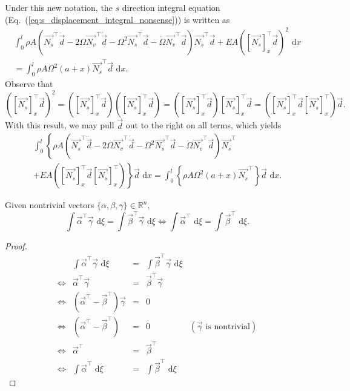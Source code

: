 Under this new notation, the $s$ direction integral equation (Eq.~(\ref{eq:s_displacement_integral_nonsense})) is written as
\begin{eqnarray}
\int_0^l \rho A\left(\vec{N_s}^\top\ddot{\vec d}-2\Omega\vec{N_v}^\top\dot{\vec{d}}-\Omega^2\vec{N_s}^\top\vec{d}-\dot\Omega \vec{N_v}^\top\vec{d}\right)\vec{N_s}^\top\vec{d}+EA\left([\vec{N_s}]_x^\top\vec{d}\right)^2 \text{ d}x  \\
= \int_0^l \rho A\Omega^2(a+x)\vec{N_s}^\top\vec{d}\text{ d}x. \nonumber
\end{eqnarray}
Observe that
\begin{equation}
\left([\vec{N_s}]_x^\top\vec{d}\right)^2 = 
\left([\vec{N_s}]_x^\top\vec{d}\right)\left([\vec{N_s}]_x^\top\vec{d}\right) = 
\left([\vec{N_s}]_x^\top\vec{d}\right)[\vec{N_s}]_x^\top\vec{d} = 
\left([\vec{N_s}]_x^\top\vec{d}[\vec{N_s}]_x^\top\right)\vec{d}.
\label{eq:vec_prod_square}
\end{equation}
With this result, we may pull $\vec d$ out to the right on all terms, which yields
\begin{eqnarray}
\int_0^l \left\lbrace\rho A\left(\vec{N_s}^\top\ddot{\vec d}-2\Omega\vec{N_v}^\top\dot{\vec{d}}-\Omega^2\vec{N_s}^\top\vec{d}-\dot\Omega \vec{N_v}^\top\vec{d}\right)\vec{N_s}^\top\right. \\
\left.+EA\left([\vec{N_s}]_x^\top\vec{d}[\vec{N_s}]_x^\top\right) \right\rbrace\vec{d}\text{ d}x = \int_0^l \left\lbrace\rho A\Omega^2(a+x)\vec{N_s}^\top\right\rbrace\vec{d}\text{ d}x. \nonumber
\end{eqnarray}
\begin{lemma}
Given nontrivial vectors $\{\alpha,\beta,\gamma\}\in\mathbb{R}^n,$
\begin{equation}
\int\vec{\alpha}^\top\vec{\gamma}\text{ d}\xi = \int\vec{\beta}^\top\vec{\gamma}\text{ d}\xi \Leftrightarrow \int\vec{\alpha}^\top\text{ d}\xi = \int\vec{\beta}^\top\text{ d}\xi.
\end{equation}
\end{lemma}
\begin{proof}
\begin{equation}
\begin{array}{rrclr}
&\int\vec{\alpha}^\top\vec{\gamma}\text{ d}\xi &=& \int\vec{\beta}^\top\vec{\gamma}\text{ d}\xi &\\
\Leftrightarrow& \vec{\alpha}^\top\vec{\gamma} &=& \vec{\beta}^\top\vec{\gamma} &\\
\Leftrightarrow& \left(\vec{\alpha}^\top -  \vec{\beta}^\top\right)\vec{\gamma} &=& 0 &\\
\Leftrightarrow& \left(\vec{\alpha}^\top-\vec{\beta}^\top\right) &=& 0 &(\vec{\gamma}\text{ is nontrivial}) \\
\Leftrightarrow& \vec{\alpha}^\top &=& \vec{\beta}^\top &\\
\Leftrightarrow& \int\vec{\alpha}^\top\text{ d}\xi &=& \int\vec{\beta}^\top\text{ d}\xi &
\end{array}
\end{equation}
\end{proof}
